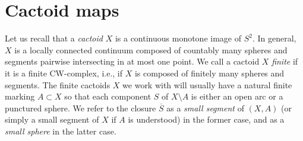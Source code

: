 \documentclass{amsart}
\theoremstyle{plain}
\theoremstyle{definition}
\theoremstyle{remark}
\newcommand{\CC}{{\mathcal C}}
\newcommand{\NL}{{\mathfrak N}}
\begin{document}
%    
%
%
%
%

\section{Cactoid maps} 
\label{sec: cactoid maps}

Let us recall that a \emph{cactoid} $X$ is a continuous monotone image of $S^2$. In general,  $X$ is a locally connected continuum composed of countably many spheres and segments pairwise intersecting in at most one point. We call a cactoid $X$ \emph{finite} if it is a finite CW-complex, i.e., if $X$ is composed of finitely many spheres and segments. The finite cactoids $X$ we work with will usually have a natural finite marking $A\subset X$ so that each component $S$ of $X\setminus A$ is either an open arc or a punctured sphere. We refer to the closure $\overline S$ as a \emph{small segment} of $(X,A)$ (or simply a small segment of $X$ if $A$ is understood) in the former case, and as a \emph{small sphere} in the latter case.
\end{document}
